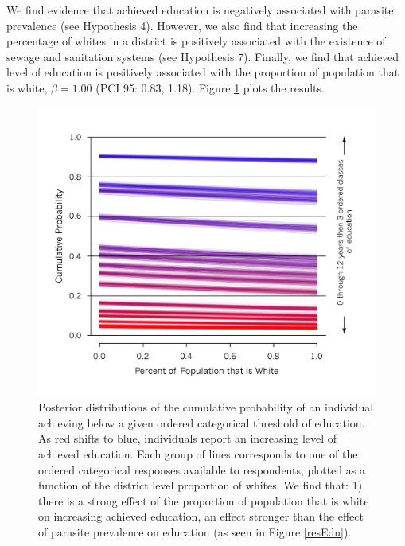 \documentclass[12pt]{article}
\begin{document}
	We find evidence that achieved education is negatively associated with parasite prevalence (see Hypothesis 4). However, we also find that increasing the percentage of whites in a district is positively associated with the existence of sewage and sanitation systems (see Hypothesis 7). Finally, we find that achieved level of education is positively associated with the proportion of population that is white, $\beta=1.00$ (PCI 95: 0.83, 1.18). Figure \ref{resWhiteEdu} plots the results.\\
 \begin{figure}
\caption{\label{resWhiteEdu} Posterior distributions of the cumulative probability of an individual achieving below a given ordered categorical threshold of education.  As red shifts to blue, individuals report an increasing level of achieved education. Each group of lines corresponds to one of the ordered categorical responses available to respondents, plotted as a function of the district level proportion of whites. We find that: 1) there is a strong effect of the proportion of population that is white on increasing achieved education, an effect stronger than the effect of parasite prevalence on education (as seen in Figure \ref{resEdu}).}
\includegraphics[width=5in]{Figures/WhiteEducationModel} 
\end{figure}  
\end{document}
